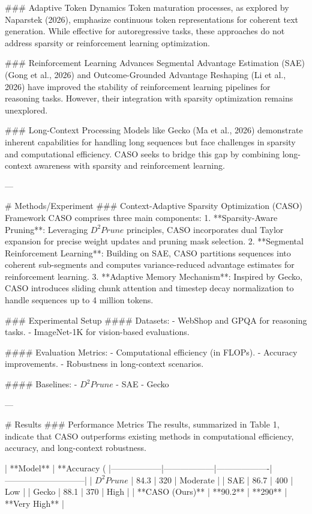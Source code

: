 ### Adaptive Token Dynamics  
Token maturation processes, as explored by Naparstek (2026), emphasize continuous token representations for coherent text generation. While effective for autoregressive tasks, these approaches do not address sparsity or reinforcement learning optimization.

### Reinforcement Learning Advances  
Segmental Advantage Estimation (SAE) (Gong et al., 2026) and Outcome-Grounded Advantage Reshaping (Li et al., 2026) have improved the stability of reinforcement learning pipelines for reasoning tasks. However, their integration with sparsity optimization remains unexplored.

### Long-Context Processing  
Models like Gecko (Ma et al., 2026) demonstrate inherent capabilities for handling long sequences but face challenges in sparsity and computational efficiency. CASO seeks to bridge this gap by combining long-context awareness with sparsity and reinforcement learning.

---

# Methods/Experiment  
### Context-Adaptive Sparsity Optimization (CASO) Framework  
CASO comprises three main components:  
1. **Sparsity-Aware Pruning**: Leveraging $D^2Prune$ principles, CASO incorporates dual Taylor expansion for precise weight updates and pruning mask selection.  
2. **Segmental Reinforcement Learning**: Building on SAE, CASO partitions sequences into coherent sub-segments and computes variance-reduced advantage estimates for reinforcement learning.  
3. **Adaptive Memory Mechanism**: Inspired by Gecko, CASO introduces sliding chunk attention and timestep decay normalization to handle sequences up to 4 million tokens.

### Experimental Setup  
#### Datasets:  
- WebShop and GPQA for reasoning tasks.  
- ImageNet-1K for vision-based evaluations.  

#### Evaluation Metrics:  
- Computational efficiency (in FLOPs).  
- Accuracy improvements.  
- Robustness in long-context scenarios.  

#### Baselines:  
- $D^2Prune$  
- SAE  
- Gecko  

---

# Results  
### Performance Metrics  
The results, summarized in Table 1, indicate that CASO outperforms existing methods in computational efficiency, accuracy, and long-context robustness.

| **Model**       | **Accuracy (%
|------------------|------------------|-------------------|-----------------------------|  
| $D^2Prune$      | 84.3             | 320               | Moderate                    |  
| SAE             | 86.7             | 400               | Low                         |  
| Gecko           | 88.1             | 370               | High                        |  
| **CASO (Ours)** | **90.2**         | **290**           | **Very High**               |  

